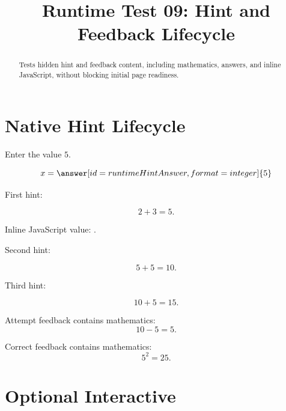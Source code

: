 \documentclass{ximera}
\title{Runtime Test 09: Hint and Feedback Lifecycle}
\begin{document}
\begin{abstract}
Tests hidden hint and feedback content, including mathematics, answers, and
inline JavaScript, without blocking initial page readiness.
\end{abstract}
\maketitle

\section{Native Hint Lifecycle}

\begin{problem}

Enter the value \(5\).

\[
x=\answer[id=runtimeHintAnswer,format=integer]{5}
\]

\begin{hint}
First hint:

\[
2+3=5.
\]

Inline JavaScript value:
.
\end{hint}

\begin{hint}
Second hint:

\[
5+5=10.
\]
\end{hint}

\begin{hint}
Third hint:

\[
10+5=15.
\]
\end{hint}

\begin{feedback}[attempt]
Attempt feedback contains mathematics:
\[
10-5=5.
\]
\end{feedback}

\begin{feedback}[correct]
Correct feedback contains mathematics:
\[
5^2=25.
\]
\end{feedback}

\end{problem}

\section{Optional Interactive}
\end{document}
